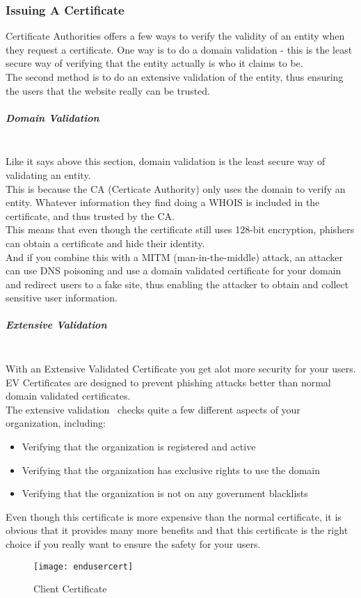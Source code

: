 \subsubsection{Issuing A Certificate}
Certificate Authorities offers a few ways to verify the validity of an entity when they request a certificate. One way is to do a domain validation - this is the least secure way of verifying that the entity actually is who it claims to be.\\
The second method is to do an extensive validation of the entity, thus ensuring the users that the website really can be trusted.
\subparagraph{Domain Validation}~\\
Like it says above this section, domain validation is the least secure way of validating an entity.\\
This is because the CA (Certicate Authority) only uses the domain to verify an entity. Whatever information they find doing a WHOIS is included in the certificate, and thus trusted by the CA.\\
This means that even though the certificate still uses 128-bit encryption, phishers can obtain a certificate and hide their identity.\\
And if you combine this with a MITM (man-in-the-middle) attack, an attacker can use DNS poisoning and use a domain validated certificate for your domain and redirect users to a fake site, thus enabling the attacker to obtain and collect sensitive user information.
\subparagraph{Extensive Validation}~\\
With an Extensive Validated Certificate you get alot more security for your users. EV Certificates are designed to prevent phishing attacks better than normal domain validated certificates.\\
The extensive validation~\cite{EVCert} checks quite a few different aspects of your organization, including:
\begin{itemize}
	\item Verifying that the organization is registered and active
	\item Verifying that the organization has exclusive rights to use the domain
	\item Verifying that the organization is not on any government blacklists
\end{itemize}
Even though this certificate is more expensive than the normal certificate, it is obvious that it provides many more benefits and that this certificate is the right choice if you really want to ensure the safety for your users.
\begin{wrapfigure}{R}{0.35\textwidth}
	\vspace{-30pt}
  \begin{center}
\texttt{[image: endusercert]}
  \end{center}
	\vspace{-20pt}
  \caption{Client Certificate}
\end{wrapfigure}
